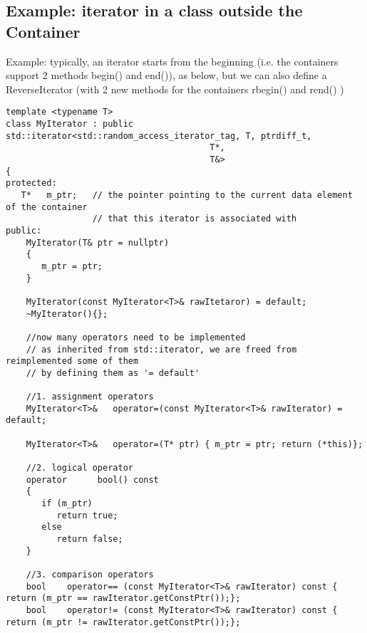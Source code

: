 \subsection{Example: iterator in a class outside the Container}
Example: typically, an iterator starts from the beginning (i.e. the containers
support 2 methods begin() and end()), as below, but we can also define a
ReverseIterator (with 2 new methods for the containers rbegin() and rend() )
\begin{lstlisting}
template <typename T>
class MyIterator : public std::iterator<std::random_access_iterator_tag, T, ptrdiff_t,
                                        T*,
                                        T&>
{
protected:
   T*   m_ptr;   // the pointer pointing to the current data element of the container 
                 // that this iterator is associated with
public:
    MyIterator(T& ptr = nullptr)
    {
       m_ptr = ptr;
    }
    
    MyIterator(const MyIterator<T>& rawItetaror) = default;
    ~MyIterator(){};
    
    //now many operators need to be implemented
    // as inherited from std::iterator, we are freed from reimplemented some of them
    // by defining them as '= default'
    
    //1. assignment operators
    MyIterator<T>&   operator=(const MyIterator<T>& rawIterator) = default;
    
    MyIterator<T>&   operator=(T* ptr) { m_ptr = ptr; return (*this)};
    
    //2. logical operator
    operator      bool() const
    {
       if (m_ptr)
          return true;
       else
          return false;
    }
    
    //3. comparison operators    
    bool    operator== (const MyIterator<T>& rawIterator) const { return (m_ptr == rawIterator.getConstPtr());};
    bool    operator!= (const MyIterator<T>& rawIterator) const { return (m_ptr != rawIterator.getConstPtr());};
    

\end{lstlisting}
